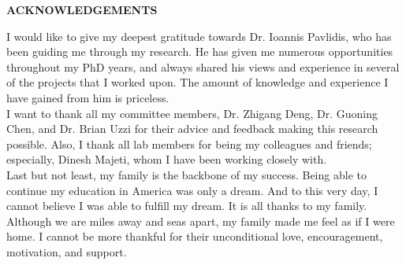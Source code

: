 \begin{center}
   {\bf ACKNOWLEDGEMENTS}\\
\end{center}


I would like to give my deepest gratitude towards Dr. Ioannis Pavlidis, who has been guiding me through my research. He has given me numerous opportunities throughout my PhD years, and always shared his views and experience in several of the projects that I worked upon. The amount of knowledge and experience I have gained from him is priceless.\\

\noindent
I want to thank all my committee members, Dr. Zhigang Deng, Dr. Guoning Chen, and Dr. Brian Uzzi for their advice and feedback making this research possible. Also, I thank all lab members for being my colleagues and friends; especially, Dinesh Majeti, whom I have been working closely with.\\

\noindent
Last but not least, my family is the backbone of my success. Being able to continue my education in America was only a dream. And to this very day, I cannot believe I was able to fulfill my dream. It is all thanks to my family. Although we are miles away and seas apart, my family made me feel as if I were home. I cannot be more thankful for their unconditional love, encouragement, motivation, and support.
